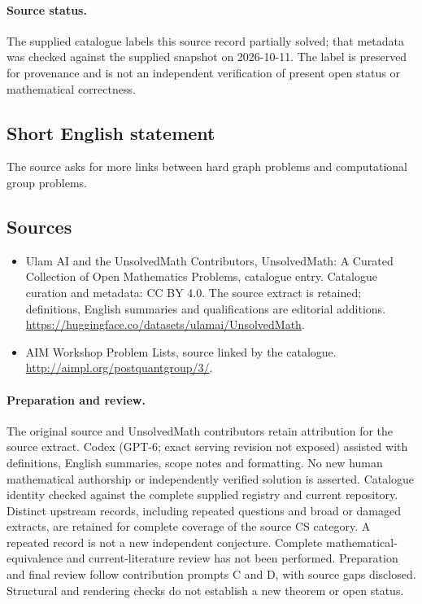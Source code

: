 \documentclass[11pt]{article}
\begin{document}
\paragraph{Source status.}
The supplied catalogue labels this source record partially solved; that metadata was checked against the supplied snapshot on 2026-10-11. The label is preserved for provenance and is not an independent verification of present open status or mathematical correctness.
\subsection{Short English statement}
The source asks for more links between hard graph problems and computational group problems.
\subsection{Sources}
\begin{itemize}
\item[\hypertarget{source:statement:1}{S1}] Ulam AI and the UnsolvedMath Contributors, UnsolvedMath: A Curated Collection of Open Mathematics Problems, catalogue entry. Catalogue curation and metadata: CC BY 4.0. The source extract is retained; definitions, English summaries and qualifications are editorial additions.
\url{https://huggingface.co/datasets/ulamai/UnsolvedMath}.
\item[\hypertarget{source:statement:2}{S2}] AIM Workshop Problem Lists, source linked by the catalogue.
\url{http://aimpl.org/postquantgroup/3/}.
\end{itemize}
\paragraph{Preparation and review.}
The original source and UnsolvedMath contributors retain attribution for the source extract. Codex (GPT-6; exact serving revision not exposed) assisted with definitions, English summaries, scope notes and formatting. No new human mathematical authorship or independently verified solution is asserted. Catalogue identity checked against the complete supplied registry and current repository. Distinct upstream records, including repeated questions and broad or damaged extracts, are retained for complete coverage of the source CS category. A repeated record is not a new independent conjecture. Complete mathematical-equivalence and current-literature review has not been performed. Preparation and final review follow contribution prompts C and D, with source gaps disclosed. Structural and rendering checks do not establish a new theorem or open status.
\label{end:statement}
\end{document}
